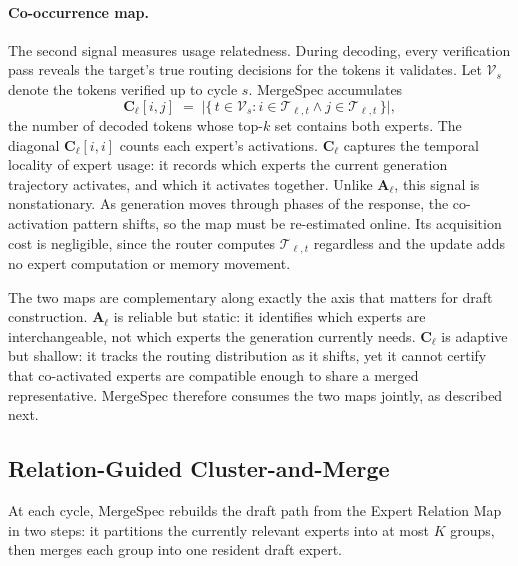 \paragraph{Co-occurrence map.}
The second signal measures usage relatedness. During decoding, every
verification pass reveals the target's true routing decisions for the
tokens it validates. Let $\mathcal{V}_{s}$ denote the tokens verified up
to cycle $s$. MergeSpec accumulates
\begin{equation}
\mathbf{C}_{\ell}[i,j] \;=\;
  \bigl|\{\, t \in \mathcal{V}_{s} :
  i \in \mathcal{T}_{\ell,t} \wedge j \in \mathcal{T}_{\ell,t} \,\}\bigr|,
\label{eq:cooccur}
\end{equation}
the number of decoded tokens whose top-$k$ set contains both experts. The
diagonal $\mathbf{C}_{\ell}[i,i]$ counts each expert's activations.
$\mathbf{C}_{\ell}$ captures the temporal locality of expert usage: it
records which experts the current generation trajectory activates, and
which it activates together. Unlike $\mathbf{A}_{\ell}$, this signal is
nonstationary. As generation moves through phases of the response, the
co-activation pattern shifts, so the map must be re-estimated online.
Its acquisition cost is negligible, since the router computes
$\mathcal{T}_{\ell,t}$ regardless and the update adds no expert
computation or memory movement.

The two maps are complementary along exactly the axis that matters for
draft construction. $\mathbf{A}_{\ell}$ is reliable but static: it
identifies which experts are interchangeable, not which experts the
generation currently needs. $\mathbf{C}_{\ell}$ is adaptive but shallow:
it tracks the routing distribution as it shifts, yet it cannot certify
that co-activated experts are compatible enough to share a merged
representative. MergeSpec therefore consumes the two maps jointly, as
described next.

\subsection{Relation-Guided Cluster-and-Merge}

At each cycle, MergeSpec rebuilds the draft path from the Expert Relation
Map in two steps: it partitions the currently relevant experts into at
most $K$ groups, then merges each group into one resident draft expert.

